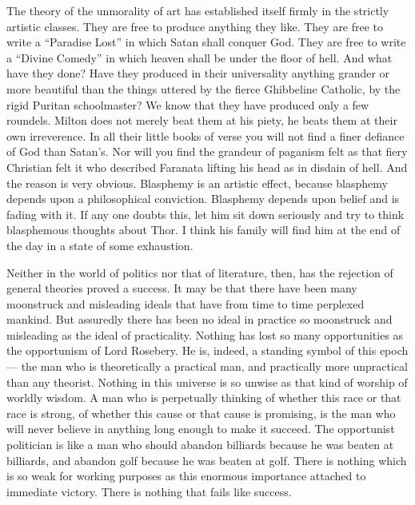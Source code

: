 The theory of the unmorality of art has established itself firmly in the strictly artistic classes. They are free to produce anything they like. They are free to write a “Paradise Lost” in which Satan shall conquer God. They are free to write a “Divine Comedy” in which heaven shall be under the floor of hell. And what have they done? Have they produced in their universality anything grander or more beautiful than the things uttered by the fierce Ghibbeline Catholic, by the rigid Puritan schoolmaster? We know that they have produced only a few roundels. Milton does not merely beat them at his piety, he beats them at their own irreverence. In all their little books of verse you will not find a finer defiance of God than Satan’s. Nor will you find the grandeur of paganism felt as that fiery Christian felt it who described Faranata lifting his head as in disdain of hell. And the reason is very obvious. Blasphemy is an artistic effect, because blasphemy depends upon a philosophical conviction. Blasphemy depends upon belief and is fading with it. If any one doubts this, let him sit down seriously and try to think blasphemous thoughts about Thor. I think his family will find him at the end of the day in a state of some exhaustion.

Neither in the world of politics nor that of literature, then, has the rejection of general theories proved a success. It may be that there have been many moonstruck and misleading ideals that have from time to time perplexed mankind. But assuredly there has been no ideal in practice so moonstruck and misleading as the ideal of practicality. Nothing has lost so many opportunities as the opportunism of Lord Rosebery. He is, indeed, a standing symbol of this epoch — the man who is theoretically a practical man, and practically more unpractical than any theorist. Nothing in this universe is so unwise as that kind of worship of worldly wisdom. A man who is perpetually thinking of whether this race or that race is strong, of whether this cause or that cause is promising, is the man who will never believe in anything long enough to make it succeed. The opportunist politician is like a man who should abandon billiards because he was beaten at billiards, and abandon golf because he was beaten at golf. There is nothing which is so weak for working purposes as this enormous importance attached to immediate victory. There is nothing that fails like success.

